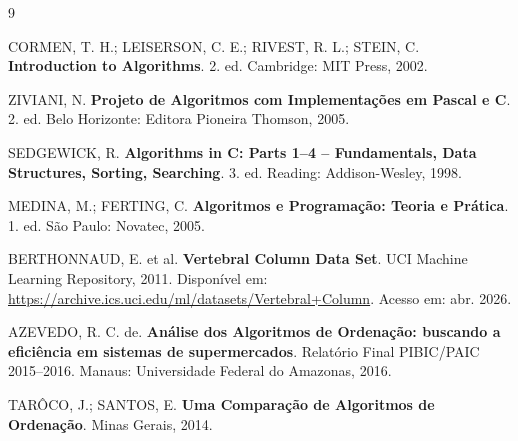 \documentclass[12pt]{article}
\begin{document}

\begin{thebibliography}{9}

CORMEN, T. H.; LEISERSON, C. E.; RIVEST, R. L.; STEIN, C.
\textbf{Introduction to Algorithms}. 2. ed. Cambridge: MIT Press, 2002.

ZIVIANI, N.
\textbf{Projeto de Algoritmos com Implementações em Pascal e C}. 2. ed.
Belo Horizonte: Editora Pioneira Thomson, 2005.

SEDGEWICK, R.
\textbf{Algorithms in C: Parts 1--4 -- Fundamentals, Data Structures, Sorting, Searching}. 3. ed.
Reading: Addison-Wesley, 1998.

MEDINA, M.; FERTING, C.
\textbf{Algoritmos e Programação: Teoria e Prática}. 1. ed.
São Paulo: Novatec, 2005.

BERTHONNAUD, E. et al.
\textbf{Vertebral Column Data Set}.
UCI Machine Learning Repository, 2011.
Disponível em: \url{https://archive.ics.uci.edu/ml/datasets/Vertebral+Column}.
Acesso em: abr. 2026.

AZEVEDO, R. C. de.
\textbf{Análise dos Algoritmos de Ordenação: buscando a eficiência em sistemas de supermercados}.
Relatório Final PIBIC/PAIC 2015--2016.
Manaus: Universidade Federal do Amazonas, 2016.

TARÔCO, J.; SANTOS, E.
\textbf{Uma Comparação de Algoritmos de Ordenação}.
Minas Gerais, 2014.

\end{thebibliography}
\end{document}
